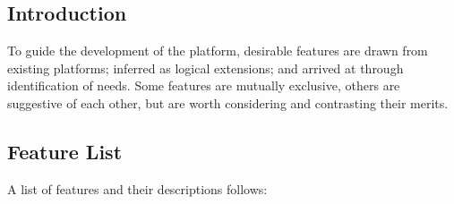 \subsection{Introduction}\label{subsec:lsf-intro}

To guide the development of the platform, desirable features are drawn
from existing platforms; inferred as logical extensions; and arrived at
through identification of needs. Some features are mutually exclusive,
others are suggestive of each other, but are worth considering and
contrasting their merits.

\subsection{Feature List}\label{subsec:feature-list}

A list of features and their descriptions follows:

